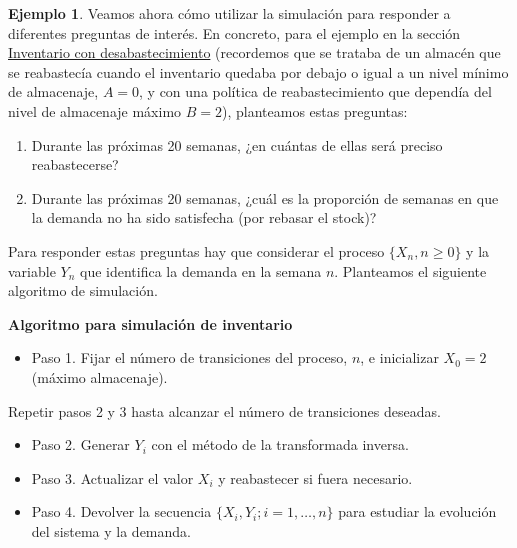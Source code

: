 \documentclass[
]{book}
\providecommand{\tightlist}{%
  \setlength{\itemsep}{0pt}\setlength{\parskip}{0pt}}
\newenvironment{silverbox}{
  \definecolor{shadecolor}{rgb}{192, 192, 192}  
  \color{black}
  \begin{shaded}}
 {\end{shaded}}
\theoremstyle{definition}
\theoremstyle{definition}
\newtheorem{example}{Ejemplo}[chapter]
\theoremstyle{definition}
\theoremstyle{definition}
\theoremstyle{remark}
\begin{document}
\begin{example}

Veamos ahora cómo utilizar la simulación para responder a diferentes preguntas de interés. En concreto, para el ejemplo en la sección \protect\hyperlink{inventario2}{Inventario con desabastecimiento} (recordemos que se trataba de un almacén que se reabastecía cuando el inventario quedaba por debajo o igual a un nivel mínimo de almacenaje, \(A=0\), y con una política de reabastecimiento que dependía del nivel de almacenaje máximo \(B=2\)), planteamos estas preguntas:

\begin{enumerate}
\def\labelenumi{\arabic{enumi}.}
\item
  Durante las próximas 20 semanas, ¿en cuántas de ellas será preciso reabastecerse?
\item
  Durante las próximas 20 semanas, ¿cuál es la proporción de semanas en que la demanda no ha sido satisfecha (por rebasar el stock)?
\end{enumerate}

\end{example}

Para responder estas preguntas hay que considerar el proceso \(\{X_n, n \geq 0\}\) y la variable \(Y_n\) que identifica la demanda en la semana \(n\). Planteamos el siguiente algoritmo de simulación.

\begin{silverbox}

\textbf{Algoritmo para simulación de inventario}

\begin{itemize}
\tightlist
\item
  Paso 1. Fijar el número de transiciones del proceso, \(n\), e inicializar \(X_0 = 2\) (máximo almacenaje).
\end{itemize}

Repetir pasos 2 y 3 hasta alcanzar el número de transiciones deseadas.

\begin{itemize}
\item
  Paso 2. Generar \(Y_i\) con el método de la transformada inversa.
\item
  Paso 3. Actualizar el valor \(X_i\) y reabastecer si fuera necesario.
\item
  Paso 4. Devolver la secuencia \(\{X_i, Y_i; i=1,\ldots,n\}\) para estudiar la evolución del sistema y la demanda.
\end{itemize}

\end{silverbox}
\end{document}
